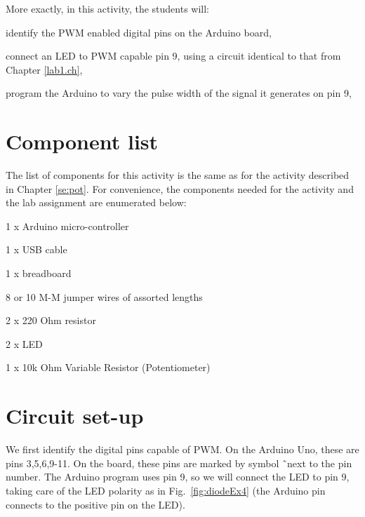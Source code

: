 \documentclass[12pt]{book}
\begin{document}
More exactly, in this activity, the students will:
\begin{compactitem}[--]
\item identify the PWM enabled digital pins on the Arduino board,
\item connect an LED to PWM capable pin 9, using a circuit identical to that from
  Chapter \ref{lab1.ch},
\item  program the Arduino to vary the pulse width of the signal
  it generates on pin 9,
\end{compactitem}

\section{Component list}

The list of components for this activity is the same as for the
activity described in Chapter \ref{se:pot}. For convenience, the
components needed for the activity and the lab assignment are enumerated
below:
\begin{compactitem}[--]
  \item 1 x Arduino micro-controller
  \item 1 x USB cable
  \item 1 x breadboard
  \item 8 or 10 M-M jumper wires of assorted lengths
	\item 2 x 220 Ohm resistor
	\item 2 x LED
  \item 1 x 10k Ohm Variable Resistor (Potentiometer)
\end{compactitem}


\section{Circuit set-up}

We first identify the digital pins capable of PWM. On the Arduino Uno,
these are pins 3,5,6,9-11. On the board, these pins are marked by
symbol
\~\ next to the pin number. The Arduino program uses pin 9, so we will
connect the LED to pin 9, taking
care of the LED polarity as in Fig.~\ref*{fig:diodeEx4} (the Arduino
pin connects to the positive pin on the LED).
\end{document}
